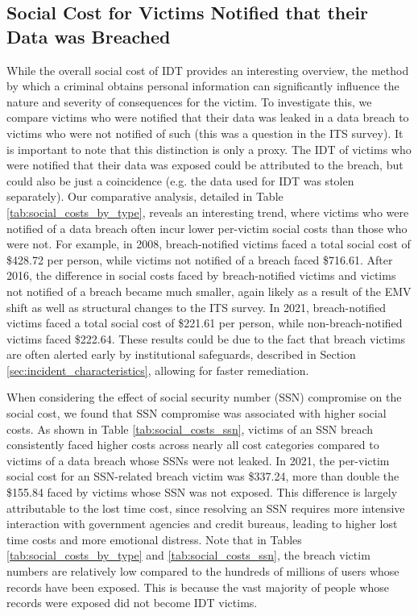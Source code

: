 \subsection{Social Cost for Victims Notified that their Data was Breached}
\label{sec:breach_victim_social_cost}

While the overall social cost of IDT provides an interesting overview, the method by which a criminal obtains personal information can significantly influence the nature and severity of consequences for the victim. To investigate this, we compare victims who were notified that their data was leaked in a data breach to victims who were not notified of such (this was a question in the ITS survey). It is important to note that this distinction is only a proxy. The IDT of victims who were notified that their data was exposed could be attributed to the breach, but could also be just a coincidence (e.g. the data used for IDT was stolen separately). Our comparative analysis, detailed in Table \ref{tab:social_costs_by_type}, reveals an interesting trend, where victims who were notified of a data breach often incur lower per-victim social costs than those who were not. For example, in 2008, breach-notified victims faced a total social cost of \$428.72 per person, while victims not notified of a breach faced \$716.61. After 2016, the difference in social costs faced by breach-notified victims and victims not notified of a breach became much smaller, again likely as a result of the EMV shift as well as structural changes to the ITS survey. In 2021, breach-notified victims faced a total social cost of \$221.61 per person, while non-breach-notified victims faced \$222.64. These results could be due to the fact that breach victims are often alerted early by institutional safeguards, described in Section \ref{sec:incident_characteristics}, allowing for faster remediation. 

When considering the effect of social security number (SSN) compromise on the social cost, we found that SSN compromise was associated with higher social costs. As shown in Table \ref{tab:social_costs_ssn}, victims of an SSN breach consistently faced higher costs across nearly all cost categories compared to victims of a data breach whose SSNs were not leaked. In 2021, the per-victim social cost for an SSN-related breach victim was \$337.24, more than double the \$155.84 faced by victims whose SSN was not exposed. This difference is largely attributable to the lost time cost, since resolving an SSN requires more intensive interaction with government agencies and credit bureaus, leading to higher lost time costs and more emotional distress. Note that in Tables \ref{tab:social_costs_by_type} and \ref{tab:social_costs_ssn}, the breach victim numbers are relatively low compared to the hundreds of millions of users whose records have been exposed. This is because the vast majority of people whose records were exposed did not become IDT victims. 

